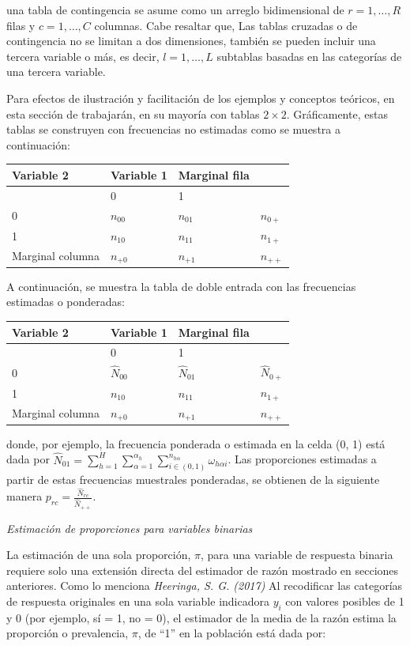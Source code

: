 \documentclass[
  12pt,
]{book}
\begin{document}
una tabla de contingencia se asume como un arreglo bidimensional de \(r=1,\ldots,R\) filas y \(c=1,\ldots,C\) columnas. Cabe resaltar que, Las tablas cruzadas o de contingencia no se limitan a dos dimensiones, también se pueden incluir una tercera variable o más, es decir, \(l=1,\ldots,L\) subtablas basadas en las categorías de una tercera variable.

Para efectos de ilustración y facilitación de los ejemplos y conceptos teóricos, en esta sección de trabajarán, en su mayoría con tablas \(2\times2\). Gráficamente, estas tablas se construyen con frecuencias no estimadas como se muestra a continuación:

\begin{longtable}[]{@{}llll@{}}
\toprule()
Variable 2 & Variable 1 & Marginal fila & \\
\midrule()
\endhead
& 0 & 1 & \\
0 & \(n_{00}\) & \(n_{01}\) & \(n_{0+}\) \\
1 & \(n_{10}\) & \(n_{11}\) & \(n_{1+}\) \\
Marginal columna & \(n_{+0}\) & \(n_{+1}\) & \(n_{++}\) \\
\bottomrule()
\end{longtable}

A continuación, se muestra la tabla de doble entrada con las frecuencias estimadas o ponderadas:

\begin{longtable}[]{@{}llll@{}}
\toprule()
Variable 2 & Variable 1 & Marginal fila & \\
\midrule()
\endhead
& 0 & 1 & \\
0 & \(\hat{N}_{00}\) & \(\hat{N}_{01}\) & \(\hat{N}_{0+}\) \\
1 & \(n_{10}\) & \(n_{11}\) & \(n_{1+}\) \\
Marginal columna & \(n_{+0}\) & \(n_{+1}\) & \(n_{++}\) \\
\bottomrule()
\end{longtable}

donde, por ejemplo, la frecuencia ponderada o estimada en la celda (0, 1) está dada por \(\hat{N}_{01}={ \sum_{h=1}^{H}\sum_{\alpha=1}^{\alpha_{h}}\sum_{i\in\left(0,1\right)}^{n_{h\alpha}}}\omega_{h\alpha i}\). Las proporciones estimadas a partir de estas frecuencias muestrales ponderadas, se obtienen de la siguiente manera \(p_{rc}=\frac{\hat{N}_{rc}}{\hat{N}_{++}}\).

\emph{Estimación de proporciones para variables binarias}

La estimación de una sola proporción, \(\pi\), para una variable de respuesta binaria requiere solo una extensión directa del estimador de razón mostrado en secciones anteriores. Como lo menciona \emph{Heeringa, S. G. (2017)} Al recodificar las categorías de respuesta originales en una sola variable indicadora \(y_{i}\) con valores posibles de 1 y 0 (por ejemplo, sí = 1, no = 0), el estimador de la media de la razón estima la proporción o prevalencia, \(\pi\), de ``1'' en la población está dada por:
\end{document}
